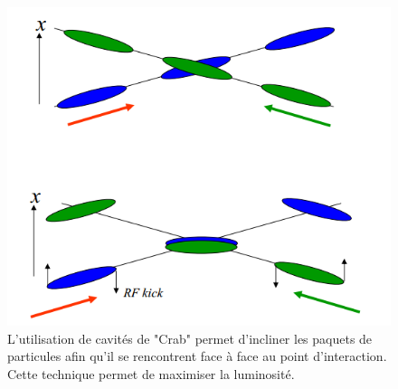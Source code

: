   \begin{figure}[!htb]
    \begin{center} 
      \includegraphics[scale=0.4]{./figures/crab_crossing.png}
      \caption{L'utilisation de cavit\'es de "Crab" permet d'incliner les paquets de particules afin qu'il se rencontrent face \`a face au point d'interaction. Cette technique permet de maximiser la luminosit\'e.}
      \label{fig:crab_crossing}
    \end{center}
  \end{figure}  
  
  \medskip
  

%   
%   
  
